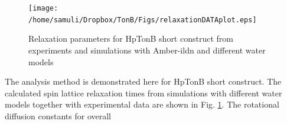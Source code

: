 \documentclass[pre,aps,floatfix,authordate1-4,twocolumn]{revtex4-1}
\begin{document}
\begin{figure}[!h]
  \texttt{[image: /home/samuli/Dropbox/TonB/Figs/relaxationDATAplot.eps]}%
  \caption{Relaxation parameters for HpTonB short construct from
    experiments and simulations with Amber-ildn and different water models
    \label{relaxationDATAplot}}%
\end{figure}
The analysis method is demonstrated here for HpTonB short construct.
The calculated spin lattice relaxation times from simulations with different
water models together with experimental data \cite{??} are shown in Fig. \ref{relaxationDATAplot}.
The rotational diffusion constants for overall 




  

\end{document}

